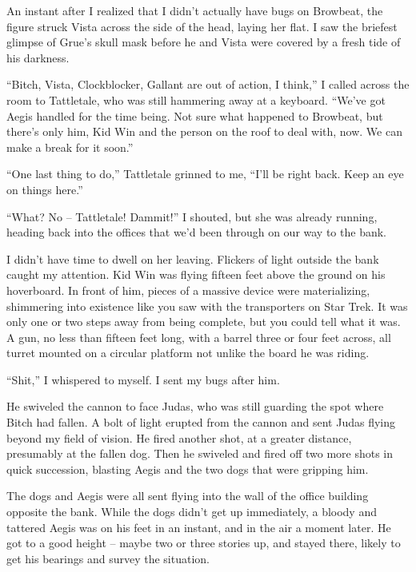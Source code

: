 An instant after I realized that I didn't actually have bugs on Browbeat, the figure struck Vista across the side of the head, laying her flat.  I saw the briefest glimpse of Grue's skull mask before he and Vista were covered by a fresh tide of his darkness.



``Bitch, Vista, Clockblocker, Gallant are out of action, I think,'' I called across the room to Tattletale, who was still hammering away at a keyboard.  ``We've got Aegis handled for the time being.  Not sure what happened to Browbeat, but there's only him, Kid Win and the person on the roof to deal with, now.  We can make a break for it soon.''



``One last thing to do,'' Tattletale grinned to me, ``I'll be right back.  Keep an eye on things here.''



``What?  No – Tattletale!  Dammit!'' I shouted, but she was already running, heading back into the offices that we'd been through on our way to the bank.



I didn't have time to dwell on her leaving.  Flickers of light outside the bank caught my attention.  Kid Win was flying fifteen feet above the ground on his hoverboard.  In front of him, pieces of a massive device were materializing, shimmering into existence like you saw with the transporters on Star Trek.  It was only one or two steps away from being complete, but you could tell what it was.  A gun, no less than fifteen feet long, with a barrel three or four feet across, all turret mounted on a circular platform not unlike the board he was riding.



``Shit,'' I whispered to myself.  I sent my bugs after him.



He swiveled the cannon to face Judas, who was still guarding the spot where Bitch had fallen.  A bolt of light erupted from the cannon and sent Judas flying beyond my field of vision.  He fired another shot, at a greater distance, presumably at the fallen dog.  Then he swiveled and fired off two more shots in quick succession, blasting Aegis and the two dogs that were gripping him.



The dogs and Aegis were all sent flying into the wall of the office building opposite the bank.  While the dogs didn't get up immediately, a bloody and tattered Aegis was on his feet in an instant, and in the air a moment later.  He got to a good height – maybe two or three stories up, and stayed there, likely to get his bearings and survey the situation.




